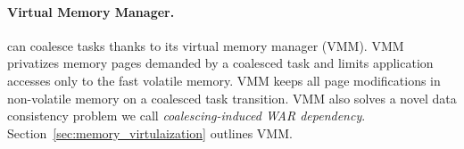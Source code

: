 \paragraph{Virtual Memory Manager.}
\sys can coalesce tasks thanks to its virtual memory manager (VMM). VMM privatizes memory pages demanded by a coalesced task and limits application accesses only to the fast volatile memory. VMM keeps all page modifications in non-volatile memory on a coalesced task transition. VMM also solves a novel data consistency problem we call \emph{coalescing-induced WAR dependency}. Section~\ref{sec:memory_virtulaization} outlines VMM.
